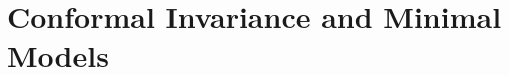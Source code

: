 \part{Conformal Invariance and Minimal Models}
\setcounter{chapter}{0} %
\renewcommand{\theHchapter}{modulo2.\arabic{chapter}} %



















